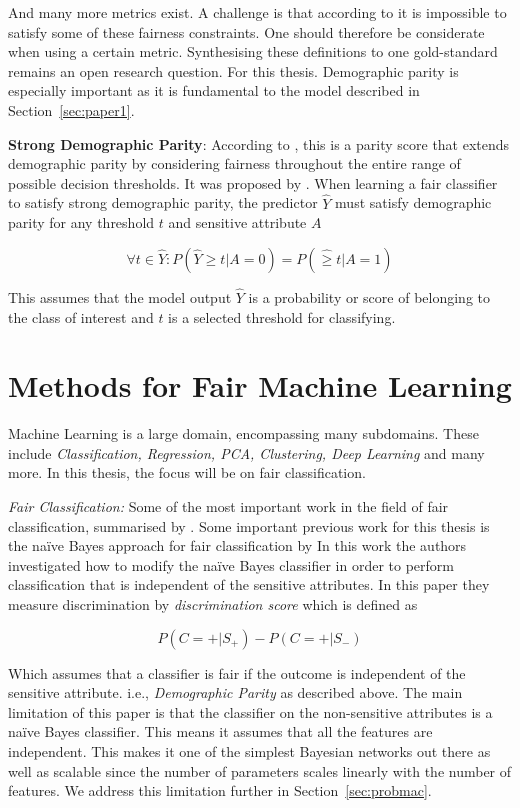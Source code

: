 And many more metrics exist. A challenge is that according to \citet{Mehrabi:2021:CSUR, Kleinberg:2017:LIPIcs} it is impossible to satisfy some of these fairness constraints. One should therefore be considerate when using a certain metric. Synthesising these definitions to one gold-standard remains an open research question. For this thesis. Demographic parity is especially important as it is fundamental to the model described in Section~\ref{sec:paper1}.

\textbf{Strong Demographic Parity}: According to \citet{Antonio:2021:arXiv}, this is a parity score that extends demographic parity by considering fairness throughout the entire range of possible decision thresholds. It was proposed by \citet{Jiang:2020:PMLR}. When learning a fair classifier to satisfy strong demographic parity, the predictor $\hat{Y}$ must satisfy demographic parity for any threshold $t$ and sensitive attribute $A$

$$
\forall t \in \hat{Y} : P(\hat{Y} \geq t | A = 0) = P(\hat \geq t | A = 1)
$$

This assumes that the model output $\hat{Y}$ is a probability or score of belonging to the class of interest and $t$ is a selected threshold for classifying.

\section{Methods for Fair Machine Learning}

Machine Learning is a large domain, encompassing many subdomains. These include \textit{Classification, Regression, PCA, Clustering, Deep Learning} and many more. In this thesis, the focus will be on fair classification. 

\textit{Fair Classification:} Some of the most important work in the field of fair classification, summarised by \cite{Mehrabi:2021:CSUR}. Some important previous work for this thesis is the naïve Bayes approach for fair classification by \citet{Calders:20210:DMKD} In this work the authors investigated how to modify the naïve Bayes classifier in order to perform classification that is independent of the sensitive attributes. In this paper they measure discrimination by \textit{discrimination score} which is defined as

\begin{equation*}
    P(C=+|S_+) - P(C=+|S_-)
\end{equation*}

Which assumes that a classifier is fair if the outcome is independent of the sensitive attribute. i.e., \textit{Demographic Parity} as described above. The main limitation of this paper is that the classifier on the non-sensitive attributes is a naïve Bayes classifier. This means it assumes that all the features are independent. This makes it one of the simplest Bayesian networks out there as well as scalable since the number of parameters scales linearly with the number of features. We address this limitation further in Section~\ref{sec:probmac}.

